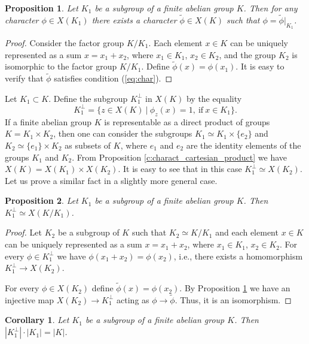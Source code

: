 \documentclass[11pt]{article}
\newtheorem{claim}{Proposition}[section]
\newtheorem{corollary}{Corollary}[section]
\theoremstyle{definition}
\begin{document}
{{{\begin{claim}\label{cl:subchar}
Let $K_1$ be a subgroup of a finite abelian group $K$. Then for any
character $\phi\in X(K_1)$ there exists a character $\widetilde{\phi}\in
X(K)$ such that $\phi=\widetilde{\phi}|_{K_1}$.
\end{claim}
\begin{proof}
Consider the factor group $K/K_1$. Each element $x\in K$
can be uniquely represented as a sum $x=x_1+x_2$, where
$x_1\in K_1$, $x_2\in K_2$, and the group $K_2$ is isomorphic to the factor group
$K/K_1$. Define $\widetilde{\phi}(x)=\phi(x_1)$. It is easy
to verify that $\widetilde{\phi}$ satisfies condition
(\ref{eq:char}).
\end{proof}

Let $K_1\subset K$. Define the subgroup $K_1^\bot$ in $X(K)$
by the equality
$$K_1^\bot=\{z\in X(K) \ |\  \phi_z(x)=1,\ \mbox{if}\ x\in K_1\}.$$
If a finite abelian group $K$ is representable as a direct
product of groups $K=K_1\times K_2$, then one can consider
the subgroups $K_1\simeq K_1\times \{e_2\}$ and $K_2\simeq \{e_1\}\times
K_2$ as subsets of $K$, where $e_1$ and $e_2$ are the identity
elements of the groups $K_1$ and $K_2$. From Proposition
\ref{c:charact_cartesian_product} we have $X(K)=X(K_1)\times
X(K_2)$. It is easy to see that in this case $K_1^\bot\simeq X(K_2)$.
Let us prove a similar fact in a slightly more general case.

\begin{claim}\label{claim:factor}
 Let $K_1$ be a subgroup of a finite abelian group $K$. Then $K_1^\bot\simeq X(K/K_1)$.
\end{claim}
\begin{proof}
Let $K_2$ be a subgroup of $K$ such that $K_2\simeq K/K_1$ and each element $x\in K$
can be uniquely represented as a sum $x=x_1+x_2$, where
$x_1\in K_1$, $x_2\in K_2$. 
For every  $\phi\in K_1^\bot$ we have $\phi(x_1+x_2)=\phi(x_2)$, i.e., there exists a homomorphism  $K_1^\bot\rightarrow X(K_2)$.

 For every $\phi\in X(K_2)$ define $\widetilde{\phi}(x)=\phi(x_2)$. By Proposition \ref{cl:subchar} we have  an injective map $X(K_2)\rightarrow K_1^\bot$ acting as  $\phi \rightarrow \widetilde{\phi}$. Thus, it is an isomorphism.
\end{proof}

\begin{corollary}\label{claim:factor1}
Let $K_1$ be a subgroup of a finite abelian group $K$.  Then
$|K_1^\bot|\cdot|K_1|=|K|$.
\end{corollary}


}}}
\end{document}
